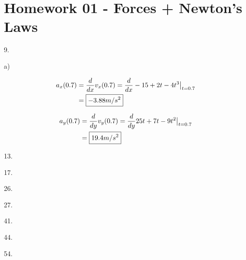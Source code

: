 \documentclass{scrreprt} %
\begin{document}
\section{Homework 01 - Forces + Newton's Laws}

9.

a)

\begin{align*}
	a_x(0.7) &= \frac{d}{dx}v_x(0.7) = \evalat{\frac{d}{dx}-15 + 2t - 4t^3}{t=0.7} \\
			 &= \boxed{-3.88 m/s^2}
\end{align*}

\begin{align*}
	a_y(0.7) &= \frac{d}{dy}v_y(0.7) = \evalat{\frac{d}{dy}25t + 7t - 9t^2}{t=0.7} \\
			 &= \boxed{19.4 m/s^2}
\end{align*}



13.

17.

26.

27.

41.

44.

54.
\end{document}

